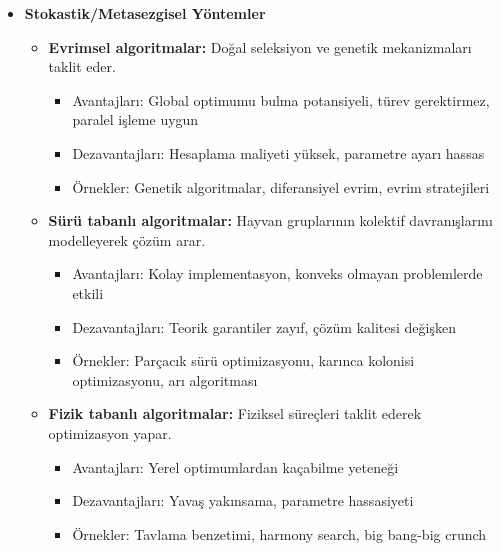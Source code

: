 \begin{itemize}
    \item \textbf{Stokastik/Metasezgisel Yöntemler}
        \begin{itemize}
            \item \textbf{Evrimsel algoritmalar:} Doğal seleksiyon ve genetik mekanizmaları taklit eder.
                \begin{itemize}
                    \item Avantajları: Global optimumu bulma potansiyeli, türev gerektirmez, paralel işleme uygun
                    \item Dezavantajları: Hesaplama maliyeti yüksek, parametre ayarı hassas
                    \item Örnekler: Genetik algoritmalar, diferansiyel evrim, evrim stratejileri
                \end{itemize}
                
            \item \textbf{Sürü tabanlı algoritmalar:} Hayvan gruplarının kolektif davranışlarını modelleyerek çözüm arar.
                \begin{itemize}
                    \item Avantajları: Kolay implementasyon, konveks olmayan problemlerde etkili
                    \item Dezavantajları: Teorik garantiler zayıf, çözüm kalitesi değişken
                    \item Örnekler: Parçacık sürü optimizasyonu, karınca kolonisi optimizasyonu, arı algoritması
                \end{itemize}
                
            \item \textbf{Fizik tabanlı algoritmalar:} Fiziksel süreçleri taklit ederek optimizasyon yapar.
                \begin{itemize}
                    \item Avantajları: Yerel optimumlardan kaçabilme yeteneği
                    \item Dezavantajları: Yavaş yakınsama, parametre hassasiyeti
                    \item Örnekler: Tavlama benzetimi, harmony search, big bang-big crunch
                \end{itemize}
        \end{itemize}
    

\end{itemize}
